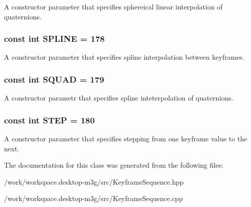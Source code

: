 A constructor parameter that specifies sphereical linear interpolation of quaternions. \hypertarget{classm3g_1_1KeyframeSequence_fbb002ac924c1349dead17c16b6fa720}{
\subsubsection[{SPLINE}]{\setlength{\rightskip}{0pt plus 5cm}const int {\bf SPLINE} = 178}}
\label{classm3g_1_1KeyframeSequence_fbb002ac924c1349dead17c16b6fa720}


A constructor parameter that specifies spline interpolation between keyframes. \hypertarget{classm3g_1_1KeyframeSequence_0ad85e76e101b5eabf5a5c5f48648845}{
\subsubsection[{SQUAD}]{\setlength{\rightskip}{0pt plus 5cm}const int {\bf SQUAD} = 179}}
\label{classm3g_1_1KeyframeSequence_0ad85e76e101b5eabf5a5c5f48648845}


A constructor parametr that specifies spline inteterpolation of quaternions. \hypertarget{classm3g_1_1KeyframeSequence_07dc1c0bf7f480095150d1b1c34c8218}{
\subsubsection[{STEP}]{\setlength{\rightskip}{0pt plus 5cm}const int {\bf STEP} = 180}}
\label{classm3g_1_1KeyframeSequence_07dc1c0bf7f480095150d1b1c34c8218}


A constructor parameter that specifies stepping from one keyframe value to the next. 

The documentation for this class was generated from the following files:\begin{CompactItemize}
\item 
/work/workspace.desktop-m3g/src/KeyframeSequence.hpp\item 
/work/workspace.desktop-m3g/src/KeyframeSequence.cpp\end{CompactItemize}
